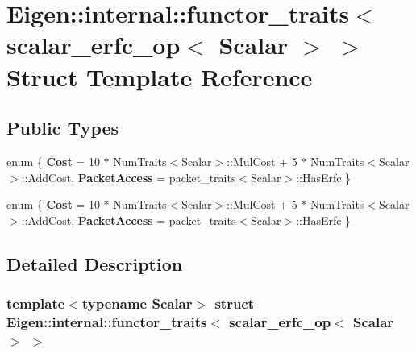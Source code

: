 \hypertarget{struct_eigen_1_1internal_1_1functor__traits_3_01scalar__erfc__op_3_01_scalar_01_4_01_4}{}\section{Eigen\+:\+:internal\+:\+:functor\+\_\+traits$<$ scalar\+\_\+erfc\+\_\+op$<$ Scalar $>$ $>$ Struct Template Reference}
\label{struct_eigen_1_1internal_1_1functor__traits_3_01scalar__erfc__op_3_01_scalar_01_4_01_4}
\subsection*{Public Types}
\begin{DoxyCompactItemize}
\item 
\mbox{\label{struct_eigen_1_1internal_1_1functor__traits_3_01scalar__erfc__op_3_01_scalar_01_4_01_4_aeead9e29d57696bc0e172d477a7e044a}} 
enum \{ {\bfseries Cost} = 10 $\ast$ Num\+Traits$<$Scalar$>$\+:\+:Mul\+Cost + 5 $\ast$ Num\+Traits$<$Scalar$>$\+:\+:Add\+Cost, 
{\bfseries Packet\+Access} = packet\+\_\+traits$<$Scalar$>$\+:\+:Has\+Erfc
 \}
\item 
\mbox{\label{struct_eigen_1_1internal_1_1functor__traits_3_01scalar__erfc__op_3_01_scalar_01_4_01_4_a76da14ef4b8a3373f6c4b581ebf42205}} 
enum \{ {\bfseries Cost} = 10 $\ast$ Num\+Traits$<$Scalar$>$\+:\+:Mul\+Cost + 5 $\ast$ Num\+Traits$<$Scalar$>$\+:\+:Add\+Cost, 
{\bfseries Packet\+Access} = packet\+\_\+traits$<$Scalar$>$\+:\+:Has\+Erfc
 \}
\end{DoxyCompactItemize}


\subsection{Detailed Description}
\subsubsection*{template$<$typename Scalar$>$\newline
struct Eigen\+::internal\+::functor\+\_\+traits$<$ scalar\+\_\+erfc\+\_\+op$<$ Scalar $>$ $>$}



